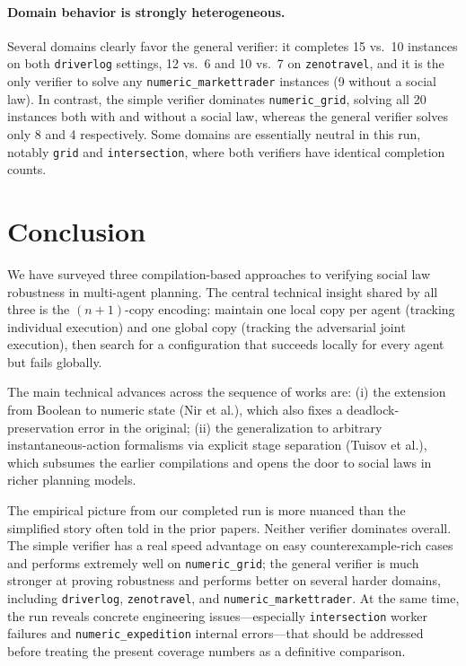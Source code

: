 \documentclass{article}
\theoremstyle{definition}
\begin{document}
\paragraph{Domain behavior is strongly heterogeneous.}
Several domains clearly favor the general verifier: it completes 15 vs.\ 10 instances on both \texttt{driverlog} settings, 12 vs.\ 6 and 10 vs.\ 7 on \texttt{zenotravel}, and it is the only verifier to solve any \texttt{numeric\_markettrader} instances (9 without a social law). In contrast, the simple verifier dominates \texttt{numeric\_grid}, solving all 20 instances both with and without a social law, whereas the general verifier solves only 8 and 4 respectively. Some domains are essentially neutral in this run, notably \texttt{grid} and \texttt{intersection}, where both verifiers have identical completion counts.

\section{Conclusion}

We have surveyed three compilation-based approaches to verifying social law robustness in multi-agent planning. The central technical insight shared by all three is the $(n+1)$-copy encoding: maintain one local copy per agent (tracking individual execution) and one global copy (tracking the adversarial joint execution), then search for a configuration that succeeds locally for every agent but fails globally.

The main technical advances across the sequence of works are: (i) the extension from Boolean to numeric state (Nir et al.), which also fixes a deadlock-preservation error in the original; (ii) the generalization to arbitrary instantaneous-action formalisms via explicit stage separation (Tuisov et al.), which subsumes the earlier compilations and opens the door to social laws in richer planning models.

The empirical picture from our completed run is more nuanced than the simplified story often told in the prior papers. Neither verifier dominates overall. The simple verifier has a real speed advantage on easy counterexample-rich cases and performs extremely well on \texttt{numeric\_grid}; the general verifier is much stronger at proving robustness and performs better on several harder domains, including \texttt{driverlog}, \texttt{zenotravel}, and \texttt{numeric\_markettrader}. At the same time, the run reveals concrete engineering issues---especially \texttt{intersection} worker failures and \texttt{numeric\_expedition} internal errors---that should be addressed before treating the present coverage numbers as a definitive comparison.
\end{document}
